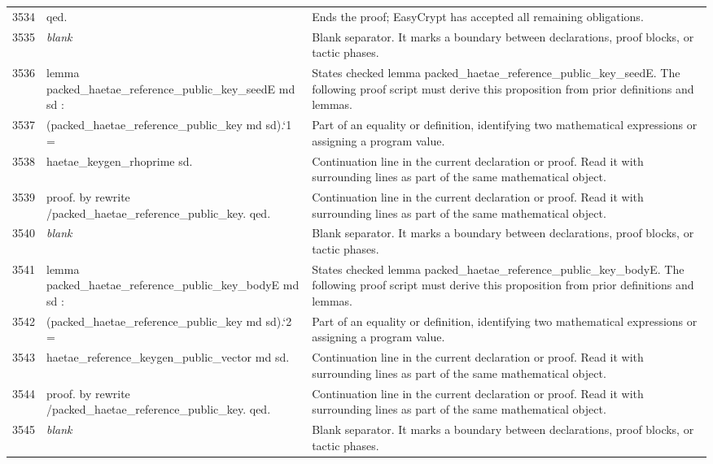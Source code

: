 \documentclass[10pt]{article}
\begin{document}
\begin{longtable}{r L{0.53\textwidth} L{0.37\textwidth}}
3534 & {\ttfamily\scriptsize qed.} & Ends the proof; EasyCrypt has accepted all remaining obligations. \\
3535 & {\ttfamily\scriptsize \emph{blank}} & Blank separator.  It marks a boundary between declarations, proof blocks, or tactic phases. \\
3536 & {\ttfamily\scriptsize lemma packed\_haetae\_reference\_public\_key\_seedE md sd :} & States checked lemma packed\_haetae\_reference\_public\_key\_seedE.  The following proof script must derive this proposition from prior definitions and lemmas. \\
3537 & {\ttfamily\scriptsize   (packed\_haetae\_reference\_public\_key md sd).`1 =} & Part of an equality or definition, identifying two mathematical expressions or assigning a program value. \\
3538 & {\ttfamily\scriptsize   haetae\_keygen\_rhoprime sd.} & Continuation line in the current declaration or proof.  Read it with surrounding lines as part of the same mathematical object. \\
3539 & {\ttfamily\scriptsize proof. by rewrite /packed\_haetae\_reference\_public\_key. qed.} & Continuation line in the current declaration or proof.  Read it with surrounding lines as part of the same mathematical object. \\
3540 & {\ttfamily\scriptsize \emph{blank}} & Blank separator.  It marks a boundary between declarations, proof blocks, or tactic phases. \\
3541 & {\ttfamily\scriptsize lemma packed\_haetae\_reference\_public\_key\_bodyE md sd :} & States checked lemma packed\_haetae\_reference\_public\_key\_bodyE.  The following proof script must derive this proposition from prior definitions and lemmas. \\
3542 & {\ttfamily\scriptsize   (packed\_haetae\_reference\_public\_key md sd).`2 =} & Part of an equality or definition, identifying two mathematical expressions or assigning a program value. \\
3543 & {\ttfamily\scriptsize   haetae\_reference\_keygen\_public\_vector md sd.} & Continuation line in the current declaration or proof.  Read it with surrounding lines as part of the same mathematical object. \\
3544 & {\ttfamily\scriptsize proof. by rewrite /packed\_haetae\_reference\_public\_key. qed.} & Continuation line in the current declaration or proof.  Read it with surrounding lines as part of the same mathematical object. \\
3545 & {\ttfamily\scriptsize \emph{blank}} & Blank separator.  It marks a boundary between declarations, proof blocks, or tactic phases. \\

\end{longtable}
\end{document}
